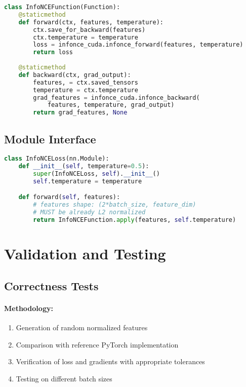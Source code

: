 \documentclass[a4paper,11pt]{article}
\begin{document}
\begin{lstlisting}[caption={Autograd integration},language=Python]
class InfoNCEFunction(Function):
    @staticmethod
    def forward(ctx, features, temperature):
        ctx.save_for_backward(features)
        ctx.temperature = temperature
        loss = infonce_cuda.infonce_forward(features, temperature)
        return loss
    
    @staticmethod
    def backward(ctx, grad_output):
        features, = ctx.saved_tensors
        temperature = ctx.temperature
        grad_features = infonce_cuda.infonce_backward(
            features, temperature, grad_output)
        return grad_features, None
\end{lstlisting}

\subsection{Module Interface}

\begin{lstlisting}[caption={Interface PyTorch},language=Python]
class InfoNCELoss(nn.Module):
    def __init__(self, temperature=0.5):
        super(InfoNCELoss, self).__init__()
        self.temperature = temperature

    def forward(self, features):
        # features shape: (2*batch_size, feature_dim)
        # MUST be already L2 normalized
        return InfoNCEFunction.apply(features, self.temperature)
\end{lstlisting}

\section{Validation and Testing}

\subsection{Correctness Tests}

\paragraph{Methodology:}
\begin{enumerate}
    \item Generation of random normalized features
    \item Comparison with reference PyTorch implementation
    \item Verification of loss and gradients with appropriate tolerances
    \item Testing on different batch sizes
\end{enumerate}
\end{document}
